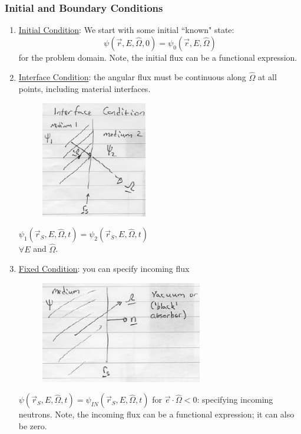 \documentclass[12pt]{article}
\newcommand{\vOmega}{\ensuremath{\hat{\Omega}}}
\begin{document}
\subsubsection{Initial and Boundary Conditions}
\begin{enumerate}
\item \underline{Initial Condition}: We start with some initial ``known" state:
\[\psi(\vec{r}, E, \vOmega, 0) = \psi_0(\vec{r}, E, \vOmega)\]
for the problem domain. Note, the initial flux can be a functional expression.

\item \underline{Interface Condition}: the angular flux must be continuous along $\vOmega$ at all points, including material interfaces.

\begin{minipage}{0.5\textwidth}
\begin{figure}[H]
\includegraphics[height=2in]{InterfaceCondition}
\end{figure}
\end{minipage} \hfill
\begin{minipage}{0.45\textwidth}
$\psi_1(\vec{r}_S, E, \vOmega, t) = \psi_2(\vec{r}_S, E, \vOmega, t)$\\ $\forall E$ and $\vOmega$.
\end{minipage}

\item \underline{Fixed Condition}: you can specify incoming flux

\begin{minipage}{0.45\textwidth}
\begin{figure}[H]
\includegraphics[height=1.75in]{FreeSurfaceCondition}
\end{figure}
\end{minipage} \hfill
\begin{minipage}{0.5\textwidth}
$\psi(\vec{r}_S, E, \vOmega, t) = \psi_{IN}(\vec{r}_S, E, \vOmega, t)$ for $\vec{e} \cdot \vOmega < 0$: specifying incoming neutrons. Note, the incoming flux can be a functional expression; it can also be zero.


\end{minipage}
\end{enumerate}
\end{document}
